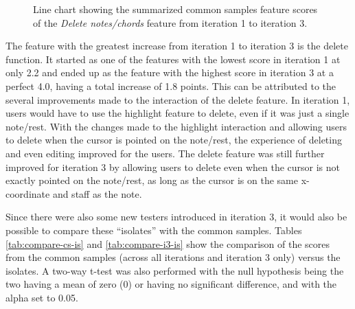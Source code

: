 		\begin{figure}[H]
			\centering
		    \caption{Line chart showing the summarized common samples feature scores of the \textit{Delete notes/chords} feature from iteration 1 to iteration 3.}
		    \label{fig:delete-line}
		\end{figure} 
		
		The feature with the greatest increase from iteration 1 to iteration 3 is the delete function. It started as one of the features with the lowest score in iteration 1 at only 2.2 and ended up as the feature with the highest score in iteration 3 at a perfect 4.0, having a total increase of 1.8 points. This can be attributed to the several improvements made to the interaction of the delete feature. In iteration 1, users would have to use the highlight feature to delete, even if it was just a single note/rest. With the changes made to the highlight interaction and allowing users to delete when the cursor is pointed on the note/rest, the experience of deleting and even editing improved for the users. The delete feature was still further improved for iteration 3 by allowing users to delete even when the cursor is not exactly pointed on the note/rest, as long as the cursor is on the same x-coordinate and staff as the note. 


		Since there were also some new testers introduced in iteration 3, it would also be possible to compare these ``isolates'' with the common samples. Tables \ref{tab:compare-cs-is} and \ref{tab:compare-i3-is} show the comparison of the scores from the common samples (across all iterations and iteration 3 only) versus the isolates. A two-way t-test was also performed with the null hypothesis being the two having a mean of zero (0) or having no significant difference, and with the alpha set to 0.05.

